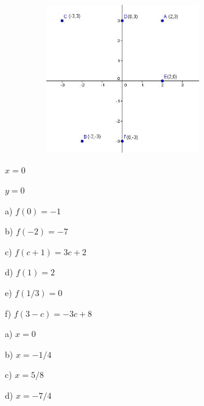 \begin{respostas}{2}
\begin{figure}[H]
\ansitem{}

\includegraphics[width=3.2in,height=2.52in]{capitulos/funcao_do_primeiro_grau/media/image25.jpeg}
\end{figure}
\ansitem{}  \( x=0 \) 

\ansitem{}  \( y=0 \) 

\ansitem{}

\begin{multicols}{3}
a)  \( f \left( 0 \right) =-1 \)

b)  \( f \left( -2 \right) =-7 \)

c)  \( f \left( c+1 \right) =3c+2 \)

d)  \( f \left( 1 \right) =2 \)

e)  \( f \left( 1/3 \right) =0 \) 

f)  \( f \left( 3-c \right) =-3c+8 \) 
\end{multicols}

\ansitem{}

\begin{multicols}{2}
a)  \( x= 0  \)

b) \( x=-1/4 \)

c)  \( x=5/8 \)

d)  \( x=-7/4 \)
\end{multicols}

\begin{figure}[H]
	\ansitem{}


\end{figure}
\end{respostas}
